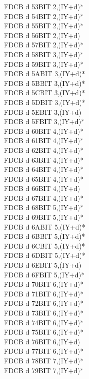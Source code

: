 \documentclass[oneside,a4paper]{book}
\begin{document}
\begin{multicols}{3}
{\begin{tabbing}
FDCB d 53\>BIT 2,(IY+d)*\\
FDCB d 54\>BIT 2,(IY+d)*\\
FDCB d 55\>BIT 2,(IY+d)*\\
FDCB d 56\>BIT 2,(IY+d)\\
FDCB d 57\>BIT 2,(IY+d)*\\
FDCB d 58\>BIT 3,(IY+d)*\\
FDCB d 59\>BIT 3,(IY+d)*\\
FDCB d 5A\>BIT 3,(IY+d)*\\
FDCB d 5B\>BIT 3,(IY+d)*\\
FDCB d 5C\>BIT 3,(IY+d)*\\
FDCB d 5D\>BIT 3,(IY+d)*\\
FDCB d 5E\>BIT 3,(IY+d)\\
FDCB d 5F\>BIT 3,(IY+d)*\\
FDCB d 60\>BIT 4,(IY+d)*\\
FDCB d 61\>BIT 4,(IY+d)*\\
FDCB d 62\>BIT 4,(IY+d)*\\
FDCB d 63\>BIT 4,(IY+d)*\\
FDCB d 64\>BIT 4,(IY+d)*\\
FDCB d 65\>BIT 4,(IY+d)*\\
FDCB d 66\>BIT 4,(IY+d)\\
FDCB d 67\>BIT 4,(IY+d)*\\
FDCB d 68\>BIT 5,(IY+d)*\\
FDCB d 69\>BIT 5,(IY+d)*\\
FDCB d 6A\>BIT 5,(IY+d)*\\
FDCB d 6B\>BIT 5,(IY+d)*\\
FDCB d 6C\>BIT 5,(IY+d)*\\
FDCB d 6D\>BIT 5,(IY+d)*\\
FDCB d 6E\>BIT 5,(IY+d)\\
FDCB d 6F\>BIT 5,(IY+d)*\\
FDCB d 70\>BIT 6,(IY+d)*\\
FDCB d 71\>BIT 6,(IY+d)*\\
FDCB d 72\>BIT 6,(IY+d)*\\
FDCB d 73\>BIT 6,(IY+d)*\\
FDCB d 74\>BIT 6,(IY+d)*\\
FDCB d 75\>BIT 6,(IY+d)*\\
FDCB d 76\>BIT 6,(IY+d)\\
FDCB d 77\>BIT 6,(IY+d)*\\
FDCB d 78\>BIT 7,(IY+d)*\\
FDCB d 79\>BIT 7,(IY+d)*\\

\end{tabbing}}
\end{multicols}
\end{document}
